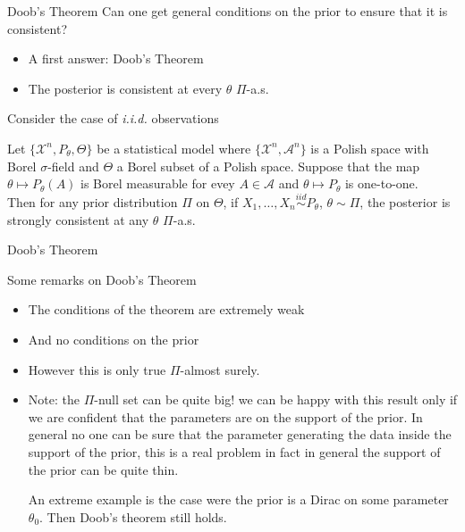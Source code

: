 \begin{frame}{Doob's Theorem}
Can one get general conditions on the prior to ensure that it is consistent? \pause 
\begin{itemize}[<+->]
 \item A first answer: Doob's Theorem
 \item The posterior is consistent at every $\theta$ $\Pi$-a.s. 
 \end{itemize} 
 \pause 
 Consider the case of \emph{i.i.d.} observations
 \begin{theorem}
 Let $\{\mathcal{X}^n, P_\theta, \Theta\}$ be a statistical model where $\{\mathcal{X}^n,\mathcal{A}^n\}$ is a Polish space with Borel $\sigma$-field and $\Theta$ a Borel subset of a Polish space. Suppose that the map $\theta \mapsto P_\theta(A)$ is Borel measurable for evey $A\in \mathcal{A}$ and $\theta \mapsto P_\theta$ is one-to-one. \\
 Then for any prior distribution $\Pi$ on $\Theta$, if $X_1, \dots, X_n \overset{iid}{\sim} P_\theta$, $\theta \sim \Pi$, \alert{the posterior is strongly consistent at any $\theta$ $\Pi$-a.s.}
 \end{theorem}
\end{frame}

\begin{frame}{Doob's Theorem}
\begin{block}{Some remarks on Doob's Theorem}
\begin{itemize}[<+->]
\item The conditions of the theorem are extremely weak
\item And no conditions on the prior
\item However this is only true \alert{$\Pi$-almost surely}. 
\item Note: the $\Pi$-null set can be quite big! we can be happy with this result only if we are confident that the parameters are on the support of the prior. In general no one can be sure that the parameter generating the data inside the support of the prior, this is a real problem in fact in general the support of the prior can be quite thin. 

An extreme example is the case were the prior is a Dirac on some parameter $\theta_0$. Then Doob's theorem still holds. 

\end{itemize}
\end{block}
\end{frame}

